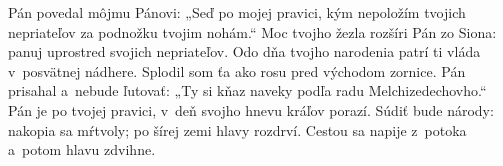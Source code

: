 Pán povedal môjmu Pánovi: „Seď po mojej pravici,
\versseparator
kým nepoložím tvojich nepriateľov za podnožku tvojim nohám.“
\versseparator
Moc tvojho žezla rozšíri Pán zo Siona:
panuj uprostred svojich nepriateľov.
\versseparator
Odo dňa tvojho narodenia patrí ti vláda
v~posvätnej nádhere.
Splodil som ťa ako rosu pred východom zornice.
\versseparator
Pán prisahal a~nebude ľutovať:
„Ty si kňaz naveky podľa radu Melchizedechovho.“
\versseparator
Pán je po tvojej pravici,
v~deň svojho hnevu kráľov porazí.
\versseparator
Súdiť bude národy: nakopia sa mŕtvoly;
po šírej zemi hlavy rozdrví.
\versseparator
Cestou sa napije z~potoka
a~potom hlavu zdvihne.